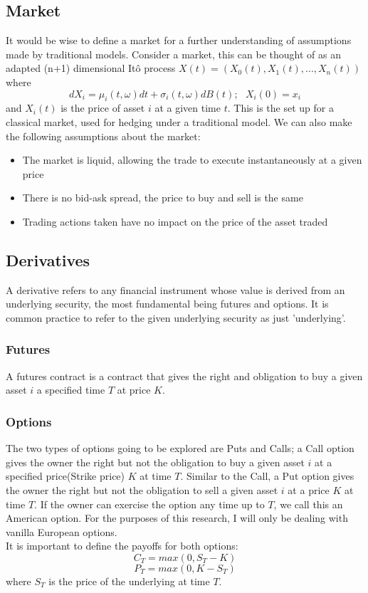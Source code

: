 \documentclass[12pt]{article}
\numberwithin{equation}{section}
\begin{document}
\subsection{Market}
It would be wise to define a market for a further understanding of assumptions 
made by traditional models. 
Consider a market, this can be thought of as an adapted (n+1) dimensional 
It\^{o} process 
$X(t) = (X_0(t), X_1(t),...,X_n(t))$
where 
\begin{equation}
dX_i = \mu_i(t,\omega)dt+\sigma_i(t,\omega)dB(t);\hspace{8pt}X_i(0)=x_i 
\end{equation}
and $X_i(t)$ is the price of asset $i$ at a given time $t$. This is the set up 
for a classical market, used for hedging under a traditional model.
We can also make the following assumptions about the market:
\begin{itemize}
  \item The market is liquid, allowing the trade to execute instantaneously at a 
    given price
  \item There is no bid-ask spread, the price to buy and sell is the same 
  \item Trading actions taken have no impact on the price of the asset traded 
\end{itemize}


\subsection{Derivatives}
A derivative refers to any financial instrument whose value is derived from an 
underlying security, the most fundamental being futures and options. It is common 
practice to refer to the given underlying security as just 'underlying'.
\subsubsection{Futures}
A futures contract is a contract that gives the right and obligation to buy a 
given asset $i$ a specified time $T$ at price $K$. 
\subsubsection{Options}
The two types of options going to be explored are Puts and Calls; a Call option 
gives the owner the right but not the obligation to buy a given asset $i$ at 
a specified price(Strike price) $K$ at time $T$. Similar to the Call, a Put option gives the 
owner the right but not the obligation to sell a given asset $i$ at a price $K$ 
at time $T$. If the owner can exercise the option any time up to $T$, we call 
this an American option. For the purposes of this research, I will only be 
dealing with vanilla European options.\\ 
It is important to define the payoffs for both options: 
\begin{equation}
C_T = max(0,S_T-K)
\end{equation}
\begin{equation}
P_T = max(0,K-S_T)
\end{equation}
where $S_T$ is the price of the underlying at time $T$. 
\end{document}
